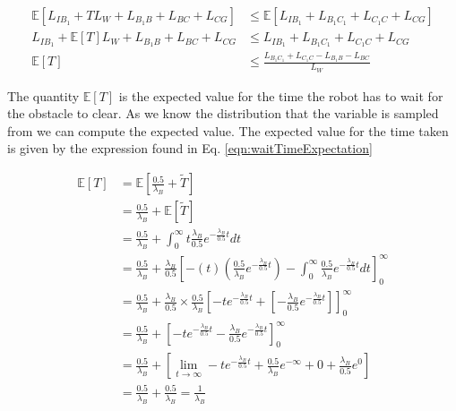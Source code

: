 \documentclass[a4paper,12pt]{article}
\begin{document}
			\begin{equation}
				\begin{split}
					\mathbb{E}\left[L_{IB_{1}} + TL_W + L_{B_{1}B} + L_{BC} + L_{CG}\right] & \leq \mathbb{E}\left[L_{IB_{1}} + L_{B_{1}C_{1}} + L_{C_{1}C} + L_{CG}\right] \\
					L_{IB_{1}} + \mathbb{E}\left[T\right] L_W + L_{B_{1}B} + L_{BC} + L_{CG} & \leq L_{IB_{1}} + L_{B_{1}C_{1}} + L_{C_{1}C} + L_{CG} \\
					\mathbb{E}\left[T\right] & \leq \frac{L_{B_{1}C_{1}} + L_{C_{1}C} - L_{B_{1}B} - L_{BC}}{L_W}
				\end{split}
				\label{eqn:costExpectation1}
			\end{equation}

			The quantity $\mathbb{E}\left[T\right]$ is the expected value for the time the robot has to wait for the obstacle to clear. As we know the distribution that the variable is sampled from we can compute the expected value. The expected value for the time taken is given by the expression found in Eq. \ref{eqn:waitTimeExpectation}

			\begin{equation}
				\begin{split}
					\mathbb{E}\left[T\right] & = \mathbb{E}\left[\frac{0.5}{\lambda_{B}}+\widetilde{T}\right] \\
					& = \frac{0.5}{\lambda_{B}} + \mathbb{E}\left[\widetilde{T}\right] \\
					& = \frac{0.5}{\lambda_{B}} + \int_{0}^{\infty}t\frac{\lambda_{B}}{0.5}e^{-\frac{\lambda_{B}}{0.5}t} dt \\
					& = \frac{0.5}{\lambda_{B}} + \frac{\lambda_{B}}{0.5}\left[-\left(t\right) \left(\frac{0.5}{\lambda_{B}}e^{-\frac{\lambda_{B}}{0.5}t}\right) - \int_{0}^{\infty}\frac{0.5}{\lambda_{B}}e^{-\frac{\lambda_{B}}{0.5}t} dt \right]_{0}^{\infty}\\
					& = \frac{0.5}{\lambda_{B}} + \frac{\lambda_{B}}{0.5} \times \frac{0.5}{\lambda_{B}} \left[-te^{-\frac{\lambda_{B}}{0.5}t} + \left[-\frac{\lambda_{B}}{0.5}e^{-\frac{\lambda_{B}}{0.5}t}\right]\right]_{0}^{\infty} \\
					& = \frac{0.5}{\lambda_{B}} + \left[-te^{-\frac{\lambda_{B}}{0.5}t} - \frac{\lambda_{B}}{0.5}e^{-\frac{\lambda_{B}}{0.5}t}\right]_{0}^{\infty} \\
					& = \frac{0.5}{\lambda_{B}} + \left[\lim_{t \to \infty} -te^{-\frac{\lambda_{B}}{0.5}t} + \frac{0.5}{\lambda_{B}}e^{-\infty} + 0 + \frac{\lambda_{B}}{0.5}e^0\right] \\
					& = \frac{0.5}{\lambda_{B}} +\frac{0.5}{\lambda_{B}} = \frac{1}{\lambda_{B}}
				\end{split}
				\label{eqn:waitTimeExpectation}
			\end{equation}
\end{document}
